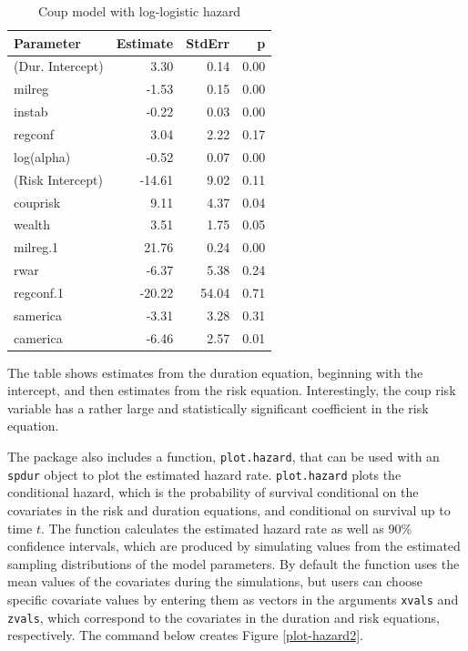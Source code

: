 \documentclass[article]{jss}
\begin{document}
\begin{table}[ht]
\centering
\caption{Coup model with log-logistic hazard} 
\label{loglog_table}
\begin{tabular}{lrrr}
  \hline
Parameter & Estimate & StdErr & p \\ 
  \hline
(Dur. Intercept) & 3.30 & 0.14 & 0.00 \\ 
  milreg & -1.53 & 0.15 & 0.00 \\ 
  instab & -0.22 & 0.03 & 0.00 \\ 
  regconf & 3.04 & 2.22 & 0.17 \\ 
  log(alpha) & -0.52 & 0.07 & 0.00 \\ 
  (Risk Intercept) & -14.61 & 9.02 & 0.11 \\ 
  couprisk & 9.11 & 4.37 & 0.04 \\ 
  wealth & 3.51 & 1.75 & 0.05 \\ 
  milreg.1 & 21.76 & 0.24 & 0.00 \\ 
  rwar & -6.37 & 5.38 & 0.24 \\ 
  regconf.1 & -20.22 & 54.04 & 0.71 \\ 
  samerica & -3.31 & 3.28 & 0.31 \\ 
  camerica & -6.46 & 2.57 & 0.01 \\ 
   \hline
\end{tabular}
\end{table}

The table shows estimates from the duration equation, beginning with the
intercept, and then estimates from the risk equation. Interestingly, the
coup risk variable has a rather large and statistically significant
coefficient in the risk equation.

The package also includes a function, \texttt{plot.hazard}, that can be
used with an \texttt{spdur} object to plot the estimated hazard rate.
\texttt{plot.hazard} plots the conditional hazard, which is the
probability of survival conditional on the covariates in the risk and
duration equations, and conditional on survival up to time \(t\). The
function calculates the estimated hazard rate as well as 90\% confidence
intervals, which are produced by simulating values from the estimated
sampling distributions of the model parameters. By default the function
uses the mean values of the covariates during the simulations, but users
can choose specific covariate values by entering them as vectors in the
arguments \texttt{xvals} and \texttt{zvals}, which correspond to the
covariates in the duration and risk equations, respectively. The command
below creates Figure \ref{plot-hazard2}.
\end{document}
